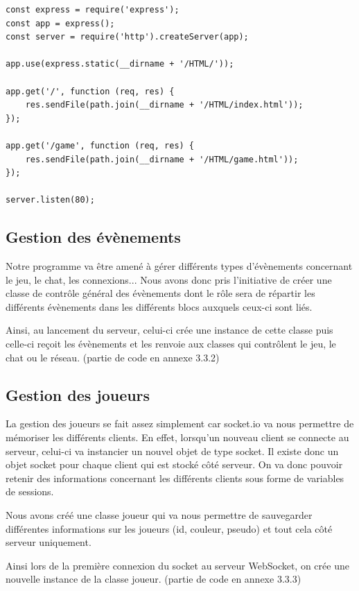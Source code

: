 \documentclass[12pt, openany]{report}
\begin{document}
\begin{verbatim}
const express = require('express');
const app = express();
const server = require('http').createServer(app);

app.use(express.static(__dirname + '/HTML/'));

app.get('/', function (req, res) {
    res.sendFile(path.join(__dirname + '/HTML/index.html'));
});

app.get('/game', function (req, res) {
    res.sendFile(path.join(__dirname + '/HTML/game.html'));
});

server.listen(80);
\end{verbatim}

\subsection{Gestion des évènements}

Notre programme va être amené à gérer différents types d'évènements concernant le jeu, le chat, les connexions...
Nous avons donc pris l'initiative de créer une classe de contrôle général des évènements dont le rôle sera de répartir les différents évènements dans les différents blocs auxquels ceux-ci sont liés.

Ainsi, au lancement du serveur, celui-ci crée une instance de cette classe puis celle-ci reçoit les évènements et les renvoie aux classes qui contrôlent le jeu, le chat ou le réseau.\newline
(partie de code en annexe 3.3.2)

\newpage
\subsection{Gestion des joueurs}

La gestion des joueurs se fait assez simplement car socket.io va nous permettre de mémoriser les différents clients. En effet, lorsqu'un nouveau client se connecte au serveur, celui-ci va instancier un nouvel objet de type socket. Il existe donc un objet socket pour chaque client qui est stocké côté serveur. On va donc pouvoir retenir des informations concernant les différents clients sous forme de variables de sessions.

Nous avons créé une classe joueur qui va nous permettre de sauvegarder différentes informations sur les joueurs (id, couleur, pseudo) et tout cela côté serveur uniquement.

Ainsi lors de la première connexion du socket au serveur WebSocket, on crée une nouvelle instance de la classe joueur.\newline
(partie de code en annexe 3.3.3)
\end{document}
